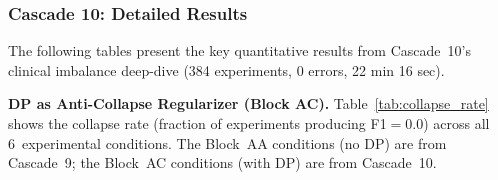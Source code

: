 \documentclass[conference]{IEEEtran}
\begin{document}
\begin{table}[htbp]
\centering
\caption{DP composition: total $\varepsilon$ after $k$ sequential studies (Block~R, 45 experiments). RDP ratio: na\"ive$/$RDP improvement factor.}
\label{tab:dp_composition}
\end{table}

\subsubsection{Cascade 10: Detailed Results}

The following tables present the key quantitative results from Cascade~10's clinical imbalance deep-dive (384 experiments, 0 errors, 22 min 16 sec).

\smallskip\noindent\textbf{DP as Anti-Collapse Regularizer (Block AC).} Table~\ref{tab:collapse_rate} shows the collapse rate (fraction of experiments producing F1$=$0.0) across all 6~experimental conditions. The Block~AA conditions (no DP) are from Cascade~9; the Block~AC conditions (with DP) are from Cascade~10.
\end{document}
